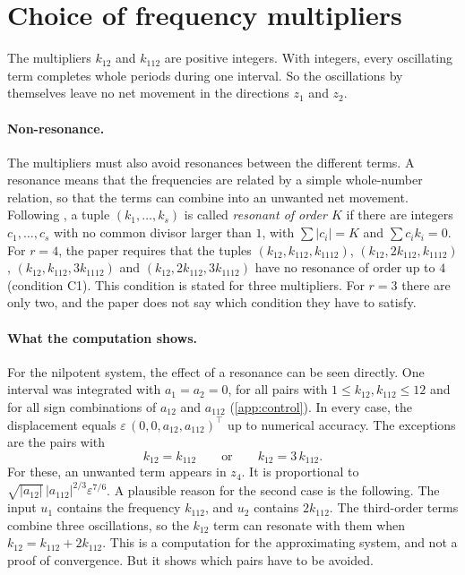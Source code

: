 \section{Choice of frequency multipliers}
\label{sec:multipliers}

The multipliers $k_{12}$ and $k_{112}$ are positive integers. With integers, every
oscillating term completes whole periods during one interval. So the
oscillations by themselves leave no net movement in the directions $z_1$ and
$z_2$.

\paragraph{Non-resonance.}
The multipliers must also avoid resonances between the different terms. A
resonance means that the frequencies are related by a simple whole-number
relation, so that the terms can combine into an unwanted net movement. Following
\cite{zuyev2024}, a tuple $(k_1,\dots,k_s)$ is called \emph{resonant of order $K$}
if there are integers $c_1,\dots,c_s$ with no common divisor larger than $1$, with
$\sum|c_i|=K$ and $\sum c_ik_i=0$. For $r=4$, the paper requires that the tuples
$(k_{12},k_{112},k_{1112})$, $(k_{12},2k_{112},k_{1112})$,
$(k_{12},k_{112},3k_{1112})$ and $(k_{12},2k_{112},3k_{1112})$ have no resonance
of order up to $4$ (condition C1). This condition is stated for three
multipliers. For $r=3$ there are only two, and the paper does not say which
condition they have to satisfy.

\paragraph{What the computation shows.}
For the nilpotent system, the effect of a resonance can be seen directly. One
interval was integrated with $a_1=a_2=0$, for all pairs with
$1\le k_{12},k_{112}\le12$ and for all sign combinations of $a_{12}$ and
$a_{112}$ (\cref{app:control}). In every case, the displacement equals
$\varepsilon\,(0,0,a_{12},a_{112})^\top$ up to numerical accuracy. The exceptions
are the pairs with
\begin{equation}
  k_{12}=k_{112}\qquad\text{or}\qquad k_{12}=3\,k_{112}.
  \label{eq:resonant}
\end{equation}
For these, an unwanted term appears in $z_4$. It is proportional to
$\sqrt{|a_{12}|}\,|a_{112}|^{2/3}\varepsilon^{7/6}$. A plausible reason for the
second case is the following. The input $u_1$ contains the frequency $k_{112}$,
and $u_2$ contains $2k_{112}$. The third-order terms combine three oscillations,
so the $k_{12}$ term can resonate with them when $k_{12}=k_{112}+2k_{112}$. This
is a computation for the approximating system, and not a proof of convergence.
But it shows which pairs have to be avoided.

